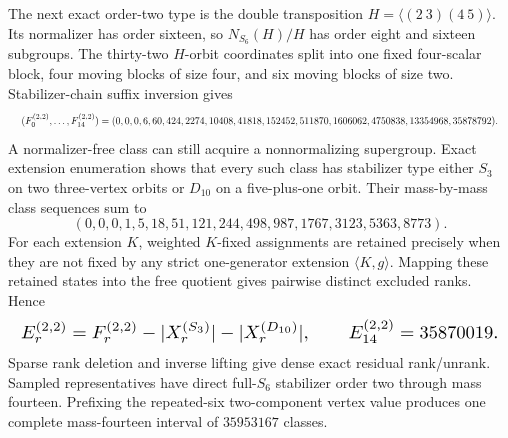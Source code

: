 \documentclass{article}
\newcommand{\fitmath}[1]{\resizebox{0.99\linewidth}{!}{$\displaystyle #1$}}
\begin{document}
The next exact order-two type is the double transposition
$H=\langle(2\ 3)(4\ 5)\rangle$. Its normalizer has order sixteen, so
$N_{S_6}(H)/H$ has order eight and sixteen subgroups. The thirty-two $H$-orbit
coordinates split into one fixed four-scalar block, four moving blocks of size
four, and six moving blocks of size two. Stabilizer-chain suffix inversion gives
\[
  \fitmath{%
    (F_0^{(2,2)},\ldots,F_{14}^{(2,2)})=
    (0,0,0,6,60,424,2274,10408,41818,152452,511870,1606062,
    4750838,13354968,35878792).
  }
\]
A normalizer-free class can still acquire a nonnormalizing supergroup. Exact
extension enumeration shows that every such class has stabilizer type either
$S_3$ on two three-vertex orbits or $D_{10}$ on a five-plus-one orbit. Their
mass-by-mass class sequences sum to
\[
  (0,0,0,1,5,18,51,121,244,498,987,1767,3123,5363,8773).
\]
For each extension $K$, weighted $K$-fixed assignments are retained precisely
when they are not fixed by any strict one-generator extension
$\langle K,g\rangle$. Mapping these retained states into the free quotient gives
pairwise distinct excluded ranks. Hence
\begin{equation}
  \fitmath{%
    E_r^{(2,2)}=F_r^{(2,2)}-|X_r^{(S_3)}|-|X_r^{(D_{10})}|,
    \qquad
    E_{14}^{(2,2)}=35870019.
  }
  \label{eq:optimization-crazy-sextuple-s6-full-double-transposition-ranking}
\end{equation}
Sparse rank deletion and inverse lifting give dense exact residual rank/unrank.
Sampled representatives have direct full-$S_6$ stabilizer order two through
mass fourteen. Prefixing the repeated-six two-component vertex value produces
one complete mass-fourteen interval of $35953167$ classes.
\end{document}
